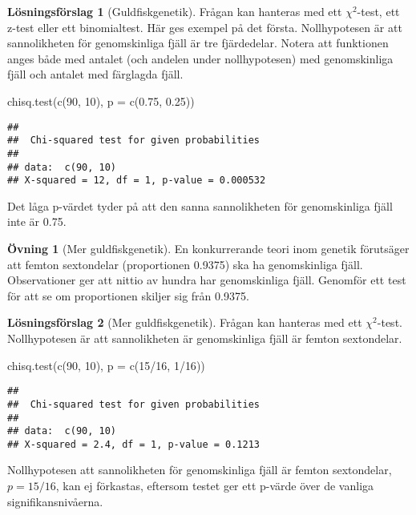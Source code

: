 \documentclass[
]{book}
\newenvironment{Shaded}{\begin{snugshade}}{\end{snugshade}}
\newcommand{\AttributeTok}[1]{\textcolor[rgb]{0.77,0.63,0.00}{#1}}
\newcommand{\DecValTok}[1]{\textcolor[rgb]{0.00,0.00,0.81}{#1}}
\newcommand{\FloatTok}[1]{\textcolor[rgb]{0.00,0.00,0.81}{#1}}
\newcommand{\FunctionTok}[1]{\textcolor[rgb]{0.00,0.00,0.00}{#1}}
\newcommand{\NormalTok}[1]{#1}
\newcommand{\SpecialCharTok}[1]{\textcolor[rgb]{0.00,0.00,0.00}{#1}}
\theoremstyle{definition}
\theoremstyle{definition}
\theoremstyle{definition}
\newtheorem{exercise}{Övning}[chapter]
\theoremstyle{definition}
\newtheorem{hypothesis}{Lösningsförslag}[chapter]
\theoremstyle{remark}
\begin{document}
\begin{hypothesis}[Guldfiskgenetik]
Frågan kan hanteras med ett \(\chi^2\)-test, ett z-test eller ett binomialtest. Här ges exempel på det första. Nollhypotesen är att sannolikheten för genomskinliga fjäll är tre fjärdedelar. Notera att funktionen anges både med antalet (och andelen under nollhypotesen) med genomskinliga fjäll och antalet med färglagda fjäll.

\begin{Shaded}
\begin{Highlighting}[]
\FunctionTok{chisq.test}\NormalTok{(}\FunctionTok{c}\NormalTok{(}\DecValTok{90}\NormalTok{, }\DecValTok{10}\NormalTok{), }\AttributeTok{p =} \FunctionTok{c}\NormalTok{(}\FloatTok{0.75}\NormalTok{, }\FloatTok{0.25}\NormalTok{))}
\end{Highlighting}
\end{Shaded}

\begin{verbatim}
## 
##  Chi-squared test for given probabilities
## 
## data:  c(90, 10)
## X-squared = 12, df = 1, p-value = 0.000532
\end{verbatim}

Det låga p-värdet tyder på att den sanna sannolikheten för genomskinliga fjäll inte är 0.75.
\end{hypothesis}

\begin{exercise}[Mer guldfiskgenetik]
En konkurrerande teori inom genetik förutsäger att femton sextondelar (proportionen 0.9375) ska ha genomskinliga fjäll. Observationer ger att nittio av hundra har genomskinliga fjäll. Genomför ett test för att se om proportionen skiljer sig från 0.9375.
\end{exercise}

\begin{hypothesis}[Mer guldfiskgenetik]
Frågan kan hanteras med ett \(\chi^2\)-test. Nollhypotesen är att sannolikheten är genomskinliga fjäll är femton sextondelar.

\begin{Shaded}
\begin{Highlighting}[]
\FunctionTok{chisq.test}\NormalTok{(}\FunctionTok{c}\NormalTok{(}\DecValTok{90}\NormalTok{, }\DecValTok{10}\NormalTok{), }\AttributeTok{p =} \FunctionTok{c}\NormalTok{(}\DecValTok{15}\SpecialCharTok{/}\DecValTok{16}\NormalTok{, }\DecValTok{1}\SpecialCharTok{/}\DecValTok{16}\NormalTok{))}
\end{Highlighting}
\end{Shaded}

\begin{verbatim}
## 
##  Chi-squared test for given probabilities
## 
## data:  c(90, 10)
## X-squared = 2.4, df = 1, p-value = 0.1213
\end{verbatim}

Nollhypotesen att sannolikheten för genomskinliga fjäll är femton sextondelar, \(p = 15/16\), kan ej förkastas, eftersom testet ger ett p-värde över de vanliga signifikansnivåerna.
\end{hypothesis}
\end{document}
